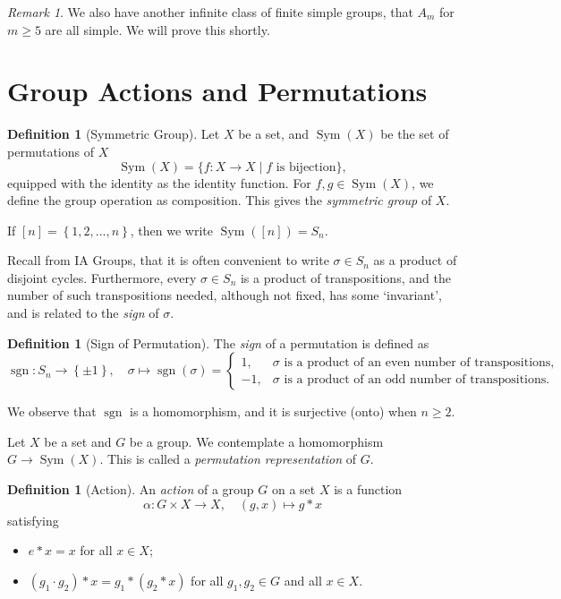 \documentclass{article}
\theoremstyle{definition}
\newtheorem{definition}[theorem]{Definition}
\theoremstyle{remark}
\newtheorem{remark}[theorem]{Remark}
\newcommand{\pqty}[1]{\left(#1\right)}
\newcommand{\bqty}[1]{\left[#1\right]}
\newcommand{\Bqty}[1]{\left\{#1\right\}}
\newcommand{\set}[2]{\{#1\mid #2\}}
\newcommand{\functiondomain}[3]{#1:#2\to #3}
\newcommand{\function}[5]{#1:#2\to #3,\quad #4\mapsto #5}
\newcommand{\Sym}{\operatorname{Sym}}
\newcommand{\sign}{\operatorname{sgn}}
\begin{document}
\begin{remark}
    We also have another infinite class of finite simple groups, that \(A_m\) for \(m \geq 5\) are all simple. We will prove this shortly.
\end{remark}

\section{Group Actions and Permutations}

\begin{definition}[Symmetric Group]
    \label{def:symmetric-group}
    Let \(X\) be a set, and \(\Sym\pqty{X}\) be the set of permutations of \(X\)
    \[
        \Sym\pqty{X} = \set{\functiondomain{f}{X}{X}}{f\text{ is bijection}},
    \]
    equipped with the identity as the identity function. For \(f, g \in \Sym\pqty{X}\), we define the group operation as composition. This gives the \emph{symmetric group} of \(X\).
    
    If \(\bqty{n} = \Bqty{1, 2, \ldots, n}\), then we write \(\Sym\pqty{\bqty{n}} = S_n\).
\end{definition}

Recall from IA Groups, that it is often convenient to write \(\sigma \in S_n\) as a product of disjoint cycles. Furthermore, every \(\sigma \in S_n\) is a product of transpositions, and the number of such transpositions needed, although not fixed, has some `invariant', and is related to the \emph{sign} of \(\sigma\).

\begin{definition}[Sign of Permutation]
    \label{def:sign-of-permutation}%
    The \emph{sign} of a permutation is defined as
    \[
        \function{\sign}{S_n}{\Bqty{\pm 1}}{\sigma}{\sign\pqty{\sigma} = \begin{cases}
            1, & \sigma \text{ is a product of an even number of transpositions}, \\
            -1, & \sigma \text{ is a product of an odd number of transpositions}.
        \end{cases}}
    \]
\end{definition}

We observe that \(\sign\) is a homomorphism, and it is surjective (onto) when \(n \geq 2\).

Let \(X\) be a set and \(G\) be a group. We contemplate a homomorphism \(G \to \Sym\pqty{X}\). This is called a \emph{permutation representation} of \(G\).

\begin{definition}[Action]
    An \emph{action} of a group \(G\) on a set \(X\) is a function
    \[
        \function{\alpha}{G \times X}{X}{\pqty{g, x}}{g \ast x}
    \]
    satisfying
    \begin{itemize}
        \item \(e \ast x = x\) for all \(x \in X\);
        \item \(\pqty{g_1 \cdot g_2} \ast x = g_1 \ast \pqty{g_2 \ast x}\) for all \(g_1, g_2 \in G\) and all \(x \in X\).
    \end{itemize}
\end{definition}
\end{document}
